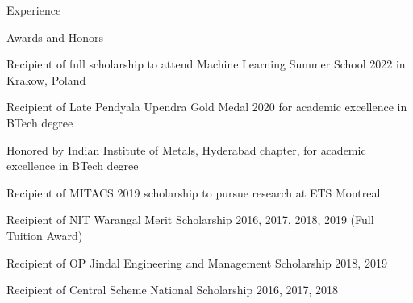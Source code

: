 \documentclass{resume} %
\begin{document}
\begin{rSection}{Experience}



\end{rSection}








\begin{rSection}{Awards and Honors} \itemsep -3pt
\item Recipient of full scholarship to attend Machine Learning Summer School 2022 in Krakow, Poland
\item Recipient of Late Pendyala Upendra Gold Medal 2020 for academic excellence in BTech degree
\item Honored by Indian Institute of Metals, Hyderabad chapter, for academic excellence in BTech degree
\item Recipient of MITACS 2019 scholarship to pursue research at ETS Montreal \hfill 
\item Recipient of NIT Warangal Merit Scholarship 2016, 2017, 2018, 2019 (Full Tuition Award)
\item Recipient of OP Jindal Engineering and Management Scholarship 2018, 2019 \hfill 
\item Recipient of Central Scheme National Scholarship 2016, 2017, 2018 \hfill 


\end{rSection}
\end{document}
